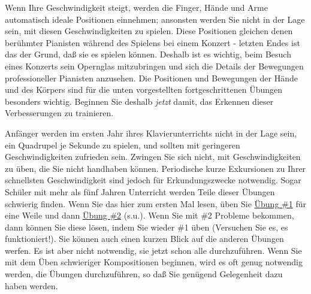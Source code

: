 Wenn Ihre Geschwindigkeit steigt, werden die Finger, Hände und Arme automatisch ideale Positionen einnehmen; ansonsten werden Sie nicht in der Lage sein, mit diesen Geschwindigkeiten zu spielen.
Diese Positionen gleichen denen berühmter Pianisten während des Spielens bei einem Konzert - letzten Endes ist das der Grund, daß sie es spielen können.
Deshalb ist es wichtig, beim Besuch eines Konzerts sein Opernglas mitzubringen und sich die Details der Bewegungen professioneller Pianisten anzusehen.
Die Positionen und Bewegungen der Hände und des Körpers sind für die unten vorgestellten fortgeschrittenen Übungen besonders wichtig.
Beginnen Sie deshalb \textit{jetzt} damit, das Erkennen dieser Verbesserungen zu trainieren.

Anfänger werden im ersten Jahr ihres Klavierunterrichts nicht in der Lage sein, ein Quadrupel je Sekunde zu spielen, und sollten mit geringeren Geschwindigkeiten zufrieden sein.
Zwingen Sie sich nicht, mit Geschwindigkeiten zu üben, die Sie nicht handhaben können.
Periodische kurze Exkursionen zu Ihrer schnellsten Geschwindigkeit sind jedoch für Erkundungszwecke notwendig.
Sogar Schüler mit mehr als fünf Jahren Unterricht werden Teile dieser Übungen schwierig finden.
Wenn Sie das hier zum ersten Mal lesen, üben Sie \hyperlink{c1iii7b1}{Übung \#1} für eine Weile und dann \hyperlink{c1iii7b2}{Übung \#2} (s.u.).
Wenn Sie mit \#2 Probleme bekommen, dann können Sie diese lösen, indem Sie wieder \#1 üben (Versuchen Sie es, es funktioniert!).
Sie können auch einen kurzen Blick auf die anderen Übungen werfen.
Es ist aber nicht notwendig, sie jetzt schon alle durchzuführen.
Wenn Sie mit dem Üben schwieriger Kompositionen beginnen, wird es oft genug notwendig werden, die Übungen durchzuführen, so daß Sie genügend Gelegenheit dazu haben werden.

